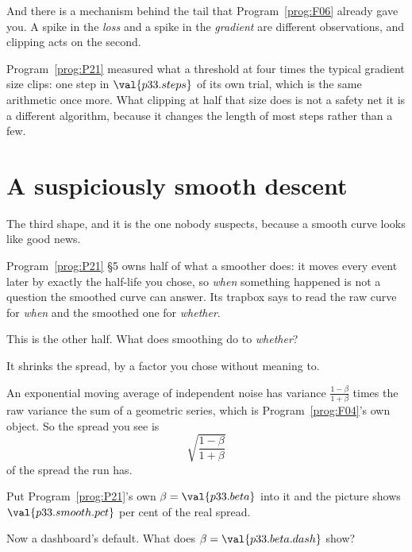 \begin{fr}
And there is a mechanism behind the tail that Program~\ref{prog:F06} already
gave you. A spike in the \emph{loss} and a spike in the \emph{gradient} are
different observations, and clipping acts on the second.

Program~\ref{prog:P21} measured what a threshold at four times the typical
gradient size clips: one step in $\val{p33.steps}$ of its own trial, which is
the same arithmetic once more. What clipping at half that size does is not a
safety net \dash{} it is a different algorithm, because it changes the length
of most steps rather than a few.
\end{fr}

\section{A suspiciously smooth descent}
\label{sec:P33-smooth}

\begin{fr}
The third shape, and it is the one nobody suspects, because a smooth curve
looks like good news.

Program~\ref{prog:P21} §5 owns half of what a smoother does: it moves every
event later by exactly the half-life you chose, so \emph{when} something
happened is not a question the smoothed curve can answer. Its trapbox says to
read the raw curve for \emph{when} and the smoothed one for \emph{whether}.

This is the other half. What does smoothing do to \emph{whether}?
\dotline
\nextframe
\end{fr}

\begin{fr}
\begin{ansblock}
It shrinks the spread, by a factor you chose without meaning to.

An exponential moving average of independent noise has variance
$\frac{1-\beta}{1+\beta}$ times the raw variance \dash{} the sum of a
geometric series, which is Program~\ref{prog:F04}'s own object. So the spread
you see is
\[ \sqrt{\frac{1-\beta}{1+\beta}} \]
of the spread the run has.
\end{ansblock}
\end{fr}

\begin{fr}
Put Program~\ref{prog:P21}'s own $\beta = \val{p33.beta}$ into it and the
picture shows $\val{p33.smooth.pct}$ per cent of the real spread.

Now a dashboard's default. What does $\beta = \val{p33.beta.dash}$ show?
\dotline
\nextframe
\end{fr}

